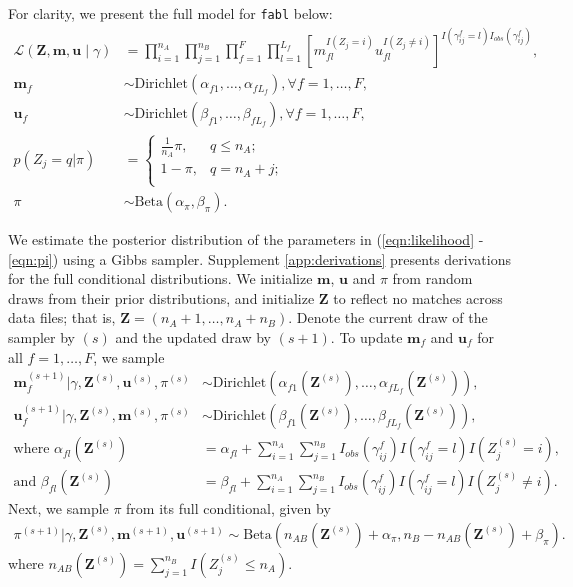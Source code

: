 \documentclass[ba]{imsart}
\begin{document}
For clarity, we present the full model for \texttt{fabl} below:
\begin{subequations}
\begin{align}
	\mathcal{L}(\bm{Z}, \bm{m}, \bm{u} \mid \gamma) &= \prod_{i=1}^{n_A}  \prod_{j=1}^{n_B}\prod_{f=1}^{F}\prod_{l=1}^{L_f}\left[  m_{fl}^{I(Z_j = i)}u_{fl}^{I(Z_j \neq i)}\right]^{I(\gamma_{ij}^f = l)I_{obs}(\gamma_{ij}^f)}, \label{eqn:likelihood}\\
	\bm{m}_f &\sim \text{Dirichlet}(\alpha_{f1}, \ldots, \alpha_{f L_f}), \forall f = 1, \ldots, F, \label{eqn:m} \\
	\bm{u}_f &\sim \text{Dirichlet}(\beta_{f1}, \ldots, \beta_{f L_f}),\forall f = 1, \ldots, F,  \label{eqn:u}\\
	p(Z_j = q| \pi)  &=
	\begin{cases} 
		\frac{1}{n_A}\pi,  & q \leq n_A; \\
		1-\pi, &  q  = n_A + j; \\
	\end{cases} \label{eqn:z}\\
	\pi &\sim \text{Beta}(\alpha_{\pi}, \beta_{\pi})\label{eqn:pi}.
\end{align}
\end{subequations}

We estimate the posterior distribution of the parameters in (\ref{eqn:likelihood} - \ref{eqn:pi}) using a Gibbs sampler. Supplement \ref{app:derivations} presents derivations for the full conditional distributions. We initialize $\bm{m}$, $\bm{u}$ and $\pi$ from random draws from their prior distributions, and initialize $\bm{Z}$ to reflect no matches across data files; that is, $\bm{Z} = (n_A + 1, \ldots, n_A + n_B)$. Denote the current draw of the sampler by $(s)$ and the updated draw by $(s+1)$. To update $\bm{m}_f$ and $\bm{u}_f$ for all $f = 1, \ldots, F$, we sample
\begin{subequations}
\begin{align}
	\bm{m}_f^{(s+1)}|\gamma, \bm{Z}^{(s)}, \bm{u}^{(s)}, \pi^{(s)} &\sim \text{Dirichlet}(\alpha_{f1}(\bm{Z}^{(s)}), \ldots, \alpha_{fL_f}(\bm{Z}^{(s)})), \label{eqn:m_update} \\
	\bm{u}_f^{(s+1)}|\gamma, \bm{Z}^{(s)}, \bm{m}^{(s)}, \pi^{(s)} &\sim \text{Dirichlet}(\beta_{f1}(\bm{Z}^{(s)}), \ldots, \beta_{fL_f}(\bm{Z}^{(s)})), \label{eqn:u_update} \\
	\text{where }\alpha_{fl}(\bm{Z}^{(s)})&= \alpha_{fl} + \sum_{i=1}^{n_A}\sum_{j=1}^{n_B} I_{obs}(\gamma_{ij}^f) I(\gamma_{ij}^f = l) I(Z_j^{(s)} = i), \label{eqn:alpha_update} \\
	\text{and } \beta_{fl}(\bm{Z}^{(s)})&=  \beta_{fl} + \sum_{i=1}^{n_A}\sum_{j=1}^{n_B}  I_{obs}(\gamma_{ij}^f) I(\gamma_{ij}^f = l) I(Z_j^{(s)} \neq i) \label{eqn:beta_update}.
\end{align}
\end{subequations}
Next, we sample $\pi$ from its full conditional, given by
\begin{align}
	\pi^{(s+1)}|\gamma, \bm{Z}^{(s)}, \bm{m}^{(s+1)}, \bm{u}^{(s+1)} \sim  \text{Beta}(n_{AB}(\bm{Z}^{(s)}) + \alpha_{\pi}, n_B - n_{AB}(\bm{Z}^{(s)}) + \beta_{\pi}).
\end{align}
where $n_{AB}(\bm{Z}^{(s)}) = \sum_{j=1}^{n_B} I(Z_j^{(s)} \leq n_A)$.
\end{document}
